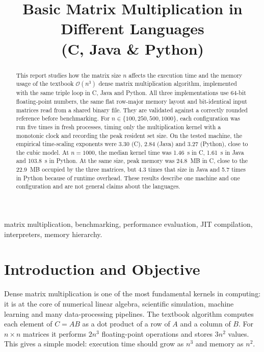 \documentclass[conference,a4paper]{IEEEtran}
\title{Basic Matrix Multiplication in Different Languages\\(C, Java \& Python)}
\author{\IEEEauthorblockN{Javier Ruano Hernández}
\IEEEauthorblockA{Big Data -- Assignment 1\\
Universidad de Las Palmas de Gran Canaria (ULPGC)\\
Code and data: \url{https://github.com/javierruanohdez/big-data-assignments/tree/main/assignment_1}}}
\newcommand{\bigO}[1]{\mathcal{O}\!\left(#1\right)}
\begin{document}
\maketitle

\begin{abstract}
This report studies how the matrix size $n$ affects the execution time and the
memory usage of the textbook $\bigO{n^3}$ dense matrix multiplication algorithm,
implemented with the same triple loop in C, Java and Python. All three
implementations use 64-bit floating-point numbers, the same flat row-major
memory layout and bit-identical input matrices read from a shared binary file.
They are validated against a correctly rounded reference before benchmarking.
For $n \in \{100, 250, 500, 1000\}$, each configuration was run five times in
fresh processes, timing only the multiplication kernel with a monotonic clock
and recording the peak resident set size.
On the tested machine, the empirical time-scaling exponents were 3.30 (C),
2.84 (Java) and 3.27 (Python), close to the cubic model. At $n=1000$, the median
kernel time was 1.46~s in C, 1.61~s in Java and 103.8~s in Python. At the same
size, peak memory was 24.8~MB in C, close to the 22.9~MB occupied by the three
matrices, but 4.3 times that size in Java and 5.7 times in Python because of
runtime overhead. These results describe one machine and one configuration and
are not general claims about the languages.
\end{abstract}

\begin{IEEEkeywords}
matrix multiplication, benchmarking, performance evaluation, JIT compilation,
interpreters, memory hierarchy.
\end{IEEEkeywords}

\section{Introduction and Objective}
\label{sec:intro}

Dense matrix multiplication is one of the most fundamental kernels in
computing: it is at the core of numerical linear algebra, scientific
simulation, machine learning and many data-processing pipelines. The textbook
algorithm computes each element of $C = AB$ as a dot product of a row of $A$
and a column of $B$. For $n \times n$ matrices it performs $2n^3$ floating-point
operations and stores $3n^2$ values. This gives a simple model: execution time
should grow as $n^3$ and memory as $n^2$.
\end{document}
